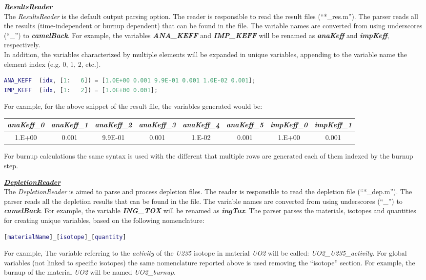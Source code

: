 \textit{\textbf{\underline{ResultsReader}}}
\\The \textit{ResultsReader} is the default output parsing option. 
The reader is responsible to read the result files (``*\_res.m'').
The parser reads all the results (time-independent  or burnup dependent) that can
be found in the file.
The variable names are converted from using underscores (``\_'') to \textit{\textbf{camelBack}}. For example,
the variables \textit{\textbf{ANA\_KEFF}} and  \textit{\textbf{IMP\_KEFF}}  will be renamed
 as \textit{\textbf{anaKeff}} and \textit{\textbf{impKeff}}, respectively. 
 \\In addition, the variables characterized by multiple elements will be expanded in unique variables, 
 appending to the variable name the element index (e.g. 0, 1, 2, etc.). 
 \begin{lstlisting}[language={matlab}]
% _res.m file
ANA_KEFF  (idx, [1:   6]) = [1.0E+00 0.001 9.9E-01 0.001 1.0E-02 0.001];
IMP_KEFF  (idx, [1:   2]) = [1.0E+00 0.001];
\end{lstlisting}
For example, for the above snippet of the result file, the variables generated would be:
\begin{table}[]
\begin{tabular}{|c|c|c|c|c|c|c|c|}
\hline
\textit{anaKeff\_0} & \textit{anaKeff\_1} & \textit{anaKeff\_2} & \textit{anaKeff\_3} & \textit{anaKeff\_4} & \textit{anaKeff\_5} & \textit{impKeff\_0} & \textit{impKeff\_1} \\ \hline
1.E+00              & 0.001               & 9.9E-01             & 0.001               & 1.E-02              & 0.001               & 1.E+00              & 0.001               \\ \hline
\end{tabular}
\end{table}
For burnup calculations the same syntax is used with the different that multiple rows are generated each of them indexed by the burnup step.

\textit{\textbf{\underline{DepletionReader}}}
\\The \textit{DepletionReader} is aimed to parse and process depletion files.
The reader is responsible to read the depletion file (``*\_dep.m'').
The parser reads all the depletion results that can
be found in the file.
The variable names are converted from using underscores (``\_'') to \textit{\textbf{camelBack}}. For example,
the variable \textit{\textbf{ING\_TOX}} will be renamed
 as \textit{\textbf{ingTox}}.
 The parser parses the materials, isotopes and quantities for creating unique variables, based on the following nomenclature:
  \begin{lstlisting}[language={matlab}]
   [materialName]_[isotope]_[quantity]
\end{lstlisting}
For example, The variable referring to the  \textit{activity}  of the  \textit{U235}  isotope in material  \textit{UO2} will be called:
\textit{UO2\_U235\_activity}.
For global variables (not linked to specific isotopes) the same nomenclature reported above is used removing the ``isotope'' section.
For example, the burnup of the material \textit{UO2} will be named \textit{UO2\_burnup}.

